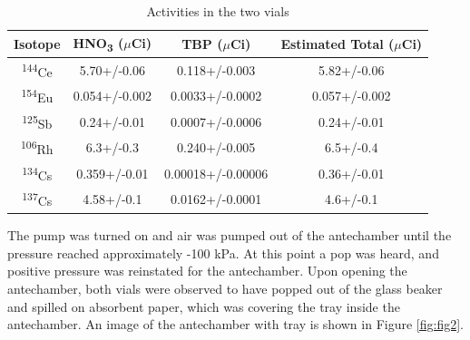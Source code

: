 \documentclass[11pt,notitlepage]{article}
\newcommand{\tss}{\textsuperscript}
\newcommand{\tsbs}{\textsubscript}
\begin{document}
\begin{table}[H]
\begin{center}
  \begin{tabular}{|c c c c|}
    \hline
    Isotope & HNO\tsbs{3} ($\mu$Ci)
    & TBP ($\mu$Ci)
    & Estimated Total ($\mu$Ci)\\ [0.5ex]
    \hline\hline
    \tss{144}Ce & 5.70+/-0.06 & 0.118+/-0.003 & 5.82+/-0.06\\
    \hline
    \tss{154}Eu & 0.054+/-0.002 & 0.0033+/-0.0002 & 0.057+/-0.002\\
    \hline
    \tss{125}Sb & 0.24+/-0.01 & 0.0007+/-0.0006 & 0.24+/-0.01\\
    \hline
    \tss{106}Rh & 6.3+/-0.3 & 0.240+/-0.005 & 6.5+/-0.4\\
    \hline
    \tss{134}Cs & 0.359+/-0.01 & 0.00018+/-0.00006 & 0.36+/-0.01\\
    \hline
    \tss{137}Cs & 4.58+/-0.1 & 0.0162+/-0.0001 & 4.6+/-0.1\\
    \hline
  \end{tabular}
  \caption{Activities in the two vials}
  \label{fig:activities}
\end{center}
\end{table}

The pump was turned on and air was pumped out
of the antechamber
until the pressure reached approximately -100 kPa. At this
point a pop was heard, and positive pressure was reinstated
for the antechamber. Upon opening the antechamber, both
vials were observed to have popped out of the glass beaker and spilled on
absorbent paper, which was covering the
tray inside the antechamber. An image of the antechamber with
tray is shown in Figure \ref{fig:fig2}.
\end{document}
